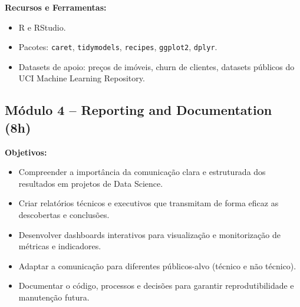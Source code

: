 \documentclass[12pt]{article}
\begin{document}
\textbf{Recursos e Ferramentas:}
\begin{itemize}
  \item R e RStudio.
  \item Pacotes: \texttt{caret}, \texttt{tidymodels}, \texttt{recipes}, \texttt{ggplot2}, \texttt{dplyr}.
  \item Datasets de apoio: preços de imóveis, churn de clientes, datasets públicos do UCI Machine Learning Repository.
\end{itemize}




%


\subsection*{Módulo 4 – Reporting and Documentation (8h)}

\textbf{Objetivos:}
\begin{itemize}
  \item Compreender a importância da comunicação clara e estruturada dos resultados em projetos de Data Science.
  \item Criar relatórios técnicos e executivos que transmitam de forma eficaz as descobertas e conclusões.
  \item Desenvolver dashboards interativos para visualização e monitorização de métricas e indicadores.
  \item Adaptar a comunicação para diferentes públicos-alvo (técnico e não técnico).
  \item Documentar o código, processos e decisões para garantir reprodutibilidade e manutenção futura.
\end{itemize}
\end{document}
